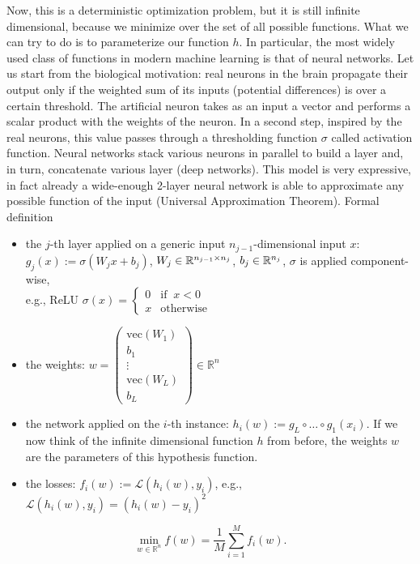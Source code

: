 \documentclass[10pt,a4paper]{article}
\begin{document}
\begin{example}
Now, this is a deterministic optimization problem, but it is still infinite dimensional, because we minimize over the set of all possible functions. What we can try to do is to parameterize our function $h$. In particular, the most widely used class of functions in modern machine learning is that of neural networks. Let us start from the biological motivation: real neurons in the brain propagate their output only if the weighted sum of its inputs (potential differences) is over a certain threshold. The artificial neuron takes as an input a vector and performs a scalar product with the weights of the neuron. In a second step, inspired by the real neurons, this value passes through a thresholding function $\sigma$ called activation function. Neural networks stack various neurons in parallel to build a layer and, in turn, concatenate various layer (deep networks). This model is very expressive, in fact already a wide-enough 2-layer neural network is able to approximate any possible function of the input (Universal Approximation Theorem). Formal definition
	\begin{itemize}
		\item the $j$-th layer applied on a generic input $n_{j-1}$-dimensional input $x$:\\
		$g_j(x) := \sigma (W_j x +b_j )$, $W_j \in \mathbb{R}^{n_{j-1}\times n_j}$, $b_j \in \mathbb{R}^{n_j}$, $\sigma$ is applied component-wise,\\ e.g., ReLU $\sigma(x)= \begin{cases} 0 & \text{if} \;\;x<0\\ x &\text{otherwise} \end{cases}$ %
		\item the weights: $w = \begin{pmatrix}
			\text{vec}(W_1)\\
			b_1\\
			\vdots\\
			\text{vec}(W_L)\\
			b_L
		\end{pmatrix}\in \mathbb{R}^{n}$
		\item the network applied on the $i$-th instance: $h_i(w):=g_L \circ \dots \circ g_1(x_i)$. If we now think of the infinite dimensional function $h$ from before, the weights $w$ are the parameters of this hypothesis function.
		\item the losses: $f_i(w):=\mathcal{L}(h_i(w),y_i)$, e.g., $\mathcal{L}(h_i(w),y_i)= (h_i(w)-y_i)^2$%
	\end{itemize}
	
	\begin{equation*}
		\min_{w\in \mathbb{R}^n} f(w) = \frac{1}{M}\sum_{i=1}^{M} f_i(w).
	\end{equation*}
\end{example}
\end{document}
